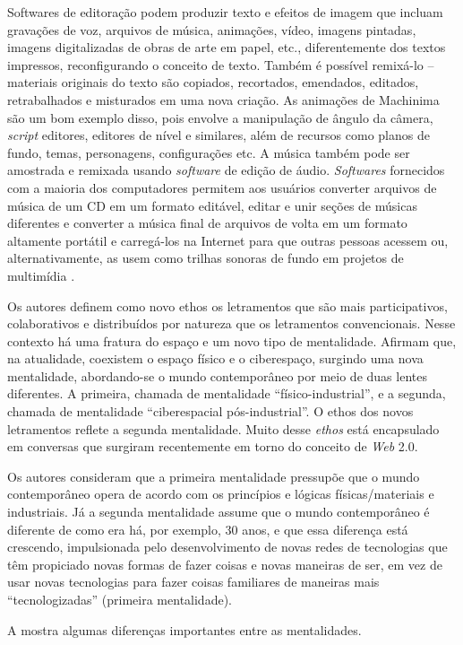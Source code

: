 \documentclass{textolivre}
\begin{document}
Softwares de editoração podem produzir texto e efeitos de imagem que incluam
gravações de voz, arquivos de música, animações, vídeo, imagens pintadas,
imagens digitalizadas de obras de arte em papel, etc., diferentemente dos
textos impressos, reconfigurando o conceito de texto. Também é possível
remixá-lo – materiais originais do texto são copiados, recortados, emendados,
editados, retrabalhados e misturados em uma nova criação. As animações de
Machinima são um bom exemplo disso, pois envolve a manipulação de ângulo da
câmera, \emph{script} editores, editores de nível e similares, além de recursos como
planos de fundo, temas, personagens, configurações etc. A música também pode
ser amostrada e remixada usando \emph{software} de edição de áudio. \emph{Softwares}
fornecidos com a maioria dos computadores permitem aos usuários converter
arquivos de música de um CD em um formato editável, editar e unir seções de
músicas diferentes e converter a música final de arquivos de volta em um
formato altamente portátil e carregá-los na Internet para que outras pessoas
acessem ou, alternativamente, as usem como trilhas sonoras de fundo em projetos
de multimídia \cite{knobel2007}.

Os autores definem como novo ethos os letramentos que são mais participativos,
colaborativos e distribuídos por natureza que os letramentos convencionais.
Nesse contexto há uma fratura do espaço e um novo tipo de mentalidade. Afirmam
que, na atualidade, coexistem o espaço físico e o ciberespaço, surgindo uma
nova mentalidade, abordando-se o mundo contemporâneo por meio de duas lentes
diferentes. A primeira, chamada de mentalidade “físico-industrial”, e a
segunda, chamada de mentalidade “ciberespacial pós-industrial”. O ethos dos
novos letramentos reflete a segunda mentalidade. Muito desse \emph{ethos} está
encapsulado em conversas que surgiram recentemente em torno do conceito de \emph{Web}
2.0.

Os autores consideram que a primeira mentalidade pressupõe que o mundo
contemporâneo opera de acordo com os princípios e lógicas físicas/materiais e
industriais. Já a segunda mentalidade assume que o mundo contemporâneo é
diferente de como era há, por exemplo, 30 anos, e que essa diferença está
crescendo, impulsionada pelo desenvolvimento de novas redes de tecnologias que
têm propiciado novas formas de fazer coisas e novas maneiras de ser, em vez de
usar novas tecnologias para fazer coisas familiares de maneiras mais
“tecnologizadas” (primeira mentalidade).

A  mostra algumas diferenças importantes entre as mentalidades.
\end{document}

